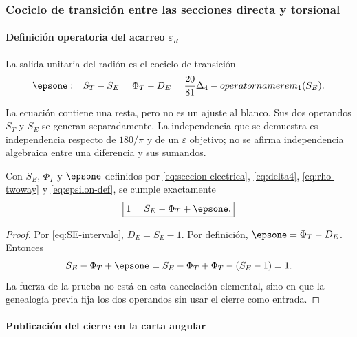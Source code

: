 \subsubsection{Cociclo de transición entre las secciones directa y torsional}

\paragraph{Definición operatoria del acarreo \(\varepsilon_R\)}

\begin{definition}
La salida unitaria del radión es el cociclo de transición
\begin{equation}
\epsone:=S_T-S_E
=\Phi_T-D_E
=\frac{20}{81}\Delta_4-operatorname{rem}_1(S_E).
\label{eq:epsilon-def}
\end{equation}
\end{definition}

La ecuación contiene una resta, pero no es un ajuste al blanco. Sus dos
operandos \(S_T\) y \(S_E\) se generan separadamente. La independencia que
se demuestra es independencia respecto de \(180/\pi\) y de un
\(\varepsilon\) objetivo; no se afirma independencia algebraica entre una
diferencia y sus sumandos.

\begin{theorem}
Con \(S_E\), \(\Phi_T\) y \(\epsone\) definidos por
\eqref{eq:seccion-electrica}, \eqref{eq:delta4}, \eqref{eq:rho-twoway} y
\eqref{eq:epsilon-def}, se cumple exactamente
\begin{equation}
\boxed{1=S_E-\Phi_T+\epsone.}
\label{eq:cierre-unitario}
\end{equation}
\end{theorem}
\begin{proof}
Por \eqref{eq:SE-intervalo}, \(D_E=S_E-1\). Por definición,
\(\epsone=\Phi_T-D_E\). Entonces
\[
S_E-\Phi_T+\epsone
=S_E-\Phi_T+\Phi_T-(S_E-1)=1.
\]
La fuerza de la prueba no está en esta cancelación elemental, sino en que la
genealogía previa fija los dos operandos sin usar el cierre como entrada.
\end{proof}

\paragraph{Publicación del cierre en la carta angular}

